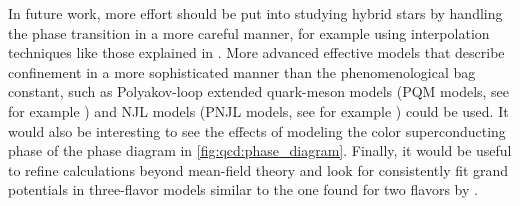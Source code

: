 In future work,
more effort should be put into studying hybrid stars by handling the phase transition in a more careful manner,
for example using interpolation techniques like those explained in \cite{ref:quark_star_review}.
More advanced effective models that describe confinement in a more sophisticated manner than the phenomenological bag constant,
such as Polyakov-loop extended quark-meson models (PQM models, see for example \cite{ref:pqm_2f,ref:pqm_3f,ref:master_folkestad}) and NJL models (PNJL models, see for example \cite{ref:pnjl_2f,ref:pnjl_3f,ref:pnjl_3f_zeroT}) could be used.
It would also be interesting to see the effects of modeling the color superconducting phase of the phase diagram in \cref{fig:qcd:phase_diagram}.
Finally, it would be useful to refine calculations beyond mean-field theory and
look for consistently fit grand potentials in three-flavor models similar to the one found for two flavors by \cite{ref:jo_lsm_consistent_chiral,ref:jo_lsm_consistent_physical}.
